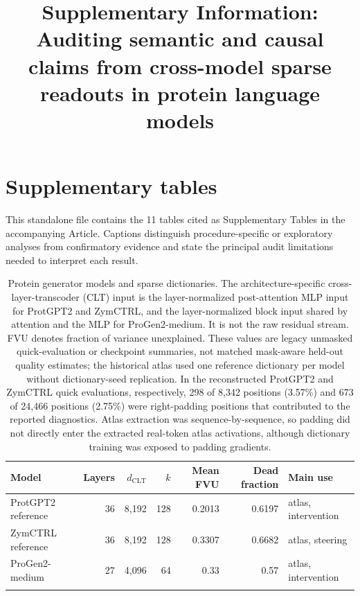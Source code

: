 \documentclass[pdflatex,sn-nature]{sn-jnl}
\begin{document}
\title[Supplementary Information]{Supplementary Information: Auditing semantic and causal claims from cross-model sparse readouts in protein language models}

\author*[1]{ }
\author[1]{ }


\maketitle

\renewcommand{\tablename}{Supplementary Table}
\setcounter{table}{0}

\section*{Supplementary tables}

This standalone file contains the 11 tables cited as Supplementary Tables in
the accompanying Article. Captions distinguish procedure-specific or
exploratory analyses from confirmatory evidence and state the principal audit
limitations needed to interpret each result.

\begin{table}[p!]
\caption{Protein generator models and sparse dictionaries. The architecture-specific cross-layer-transcoder (CLT) input is the layer-normalized post-attention MLP input for ProtGPT2 and ZymCTRL, and the layer-normalized block input shared by attention and the MLP for ProGen2-medium. It is not the raw residual stream. FVU denotes fraction of variance unexplained. These values are legacy unmasked quick-evaluation or checkpoint summaries, not matched mask-aware held-out quality estimates; the historical atlas used one reference dictionary per model without dictionary-seed replication. In the reconstructed ProtGPT2 and ZymCTRL quick evaluations, respectively, 298 of 8,342 positions (3.57\%) and 673 of 24,466 positions (2.75\%) were right-padding positions that contributed to the reported diagnostics. Atlas extraction was sequence-by-sequence, so padding did not directly enter the extracted real-token atlas activations, although dictionary training was exposed to padding gradients.}
\label{tab:supp-modelpanel}
\scriptsize
\setlength{\tabcolsep}{3pt}
\begin{tabular}{@{}>{\raggedright\arraybackslash}p{2.8cm}rrrrr>{\raggedright\arraybackslash}p{2.2cm}@{}}
\toprule
Model & Layers & $d_{\mathrm{CLT}}$ & $k$ & Mean FVU & Dead fraction & Main use \\
\midrule
ProtGPT2 reference & 36 & 8,192 & 128 & 0.2013 & 0.6197 & atlas, intervention \\
ZymCTRL reference & 36 & 8,192 & 128 & 0.3307 & 0.6682 & atlas, steering \\
ProGen2-medium & 27 & 4,096 & 64 & 0.33 & 0.57 & atlas, intervention \\
\botrule
\end{tabular}
\end{table}
\end{document}
